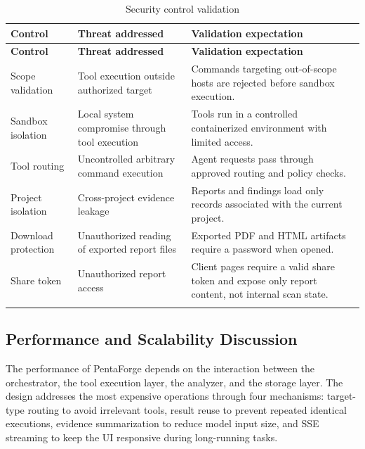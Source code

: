 \documentclass[12pt,a4paper]{report}
\begin{document}
\begin{longtable}{|p{}|p{}|p{}|}
\hline
\textbf{Control} & \textbf{Threat addressed} & \textbf{Validation expectation} \\
\hline
\endfirsthead
\hline
\textbf{Control} & \textbf{Threat addressed} & \textbf{Validation expectation} \\
\hline
\endhead
Scope validation & Tool execution outside authorized target & Commands targeting
out-of-scope hosts are rejected before sandbox execution. \\
\hline
Sandbox isolation & Local system compromise through tool execution & Tools run in
a controlled \mbox{containerized} environment with limited access. \\
\hline
Tool routing & Uncontrolled arbitrary command execution & Agent requests pass
through approved routing and policy checks. \\
\hline
Project isolation & Cross-project evidence leakage & Reports and findings load
only records associated with the current project. \\
\hline
Download protection & Unauthorized reading of exported report files & Exported PDF
and HTML artifacts require a password when opened. \\
\hline
Share token & Unauthorized report access & Client pages require a valid share token
and expose only report content, not internal scan state. \\
\hline
\caption{Security control validation}
\label{tab:security_control_validation}
\end{longtable}

\subsection{Performance and Scalability Discussion}

The performance of PentaForge depends on the interaction between the orchestrator,
the tool execution layer, the analyzer, and the storage layer. The design addresses
the most expensive operations through four mechanisms: target-type routing to avoid
irrelevant tools, result reuse to prevent repeated identical executions, evidence
summarization to reduce model input size, and SSE streaming to keep the UI responsive
during long-running tasks.
\end{document}
